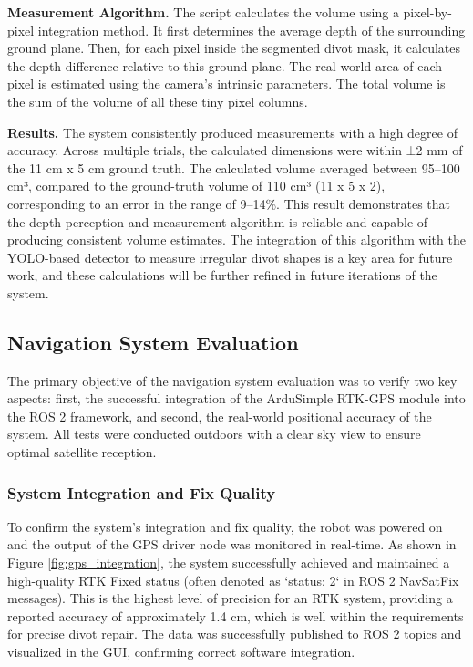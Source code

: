 \textbf{Measurement Algorithm.}
The script calculates the volume using a pixel-by-pixel integration method. It first determines the average depth of the surrounding ground plane. Then, for each pixel inside the segmented divot mask, it calculates the depth difference relative to this ground plane. The real-world area of each pixel is estimated using the camera's intrinsic parameters. The total volume is the sum of the volume of all these tiny pixel columns.

\textbf{Results.}
The system consistently produced measurements with a high degree of accuracy. 
Across multiple trials, the calculated dimensions were within ±2 mm of the 11 cm x 5 cm ground truth. 
The calculated volume averaged between 95–100 cm³, compared to the ground-truth volume of 110 cm³ (11 x 5 x 2), corresponding to an error in the range of 9–14\%. This result demonstrates that the depth perception and measurement algorithm is reliable and capable of producing consistent volume estimates. The integration of this algorithm with the YOLO-based detector to measure irregular divot shapes is a key area for future work, and these calculations will be further refined in future iterations of the system.




\subsection{Navigation System Evaluation}
\label{ssec:nav_evaluation}

The primary objective of the navigation system evaluation was to verify two key aspects: first, the successful integration of the ArduSimple RTK-GPS module into the ROS 2 framework, and second, the real-world positional accuracy of the system. All tests were conducted outdoors with a clear sky view to ensure optimal satellite reception.

\subsubsection{System Integration and Fix Quality}
To confirm the system's integration and fix quality, the robot was powered on and the output of the GPS driver node was monitored in real-time. As shown in Figure \ref{fig:gps_integration}, the system successfully achieved and maintained a high-quality RTK Fixed status (often denoted as `status: 2` in ROS 2 NavSatFix messages). This is the highest level of precision for an RTK system, providing a reported accuracy of approximately 1.4 cm, which is well within the requirements for precise divot repair. The data was successfully published to ROS 2 topics and visualized in the GUI, confirming correct software integration.


